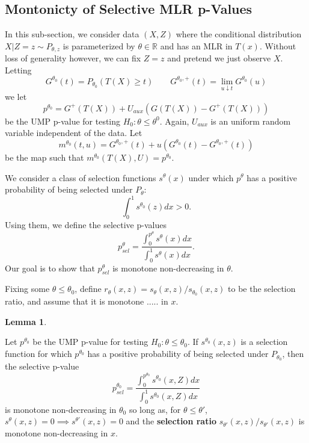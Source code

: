 \documentclass{article}
\newtheorem{lemma}{Lemma}
\newcommand{\R}{\mathbb{R}}
\begin{document}
\begin{appendix}
\subsection{Montonicty of Selective MLR p-Values}
\label{sec:one_sided_monotone_appdx}

In this sub-section, we consider data $(X, Z)$ where the conditional distribution $X | Z= z \sim P_{\theta, z}$ is parameterized by $\theta \in \R$ and has an MLR in $T(x)$. Without loss of generality however, we can fix $Z = z$ and pretend we just observe $X$. Letting
\begin{equation*}
    G^{\theta_0}(t ) = P_{\theta_0}(T(X) \geq t) \qquad G^{\theta_0, +}(t) = \lim_{u \downarrow t} G^{\theta_0}(u)
\end{equation*}
we let 
\begin{equation*}
    p^{\theta_0} = G^{+}(T(X)) + U_{aux}(G(T(X)) - G^{+}(T(X)))
\end{equation*}
be the UMP p-value for testing $H_{0}: \theta \leq \theta^{0}$. Again, $U_{aux}$ is an uniform random variable independent of the data. Let 
\begin{equation*}
    m^{\theta_0}(t, u) = G^{\theta_0, +}(t) + u(G^{\theta_0}(t) - G^{\theta_0, +}(t))
\end{equation*}
be the map such that $m^{\theta_0}(T(X), U) = p^{\theta_0}$. 

We consider a class of selection functions $s^{\theta}(x)$ under which $p^{\theta}$ has a positive probability of being selected under $P_{\theta}$:
\begin{equation*}
    \int_0^1 s^{\theta_0}(z) dx > 0. 
\end{equation*}
Using them, we define the selective p-values 
\begin{equation*}
    p^{\theta}_{sel} = \frac{\int_{0}^{p^{\theta}} s^{\theta}(x) dx}{\int_{0}^{1} s^{\theta}(x) dx}.
\end{equation*}
Our goal is to show that $p^{\theta}_{sel}$ is monotone non-decreasing in $\theta$.

Fixing some $\theta \leq \theta_0$, define $r_{\theta}(x, z) = s_{\theta}(x, z)/s_{\theta_0}(x, z)$ to be the selection ratio, and assume that it is monotone ..... in $x$. 

\begin{lemma}
    
\end{lemma}



Let $p^{\theta_0}$ be the UMP p-value for testing $H_0: \theta \leq \theta_0$. If $s^{\theta_0}(x, z)$ is a selection function for which $p^{\theta_0}$ has a positive probability of being selected under $P_{\theta_0}$, then the selective p-value 
    \begin{equation*}
        p_{sel}^{\theta_0} = \frac{\int_0^{p^{\theta_0}} s^{\theta_0}(x, Z)  dx}{ \int_0^1 s^{\theta_0}(x, Z) dx}
    \end{equation*}
    is monotone non-decreasing in $\theta_0$ so long as, for $\theta \leq \theta'$, $s^{\theta}(x, z) = 0 \implies s^{\theta'}(x, z) = 0$ and the \textbf{selection ratio} $s_{\theta'}(x, z)/s_{\theta'}(x, z)$ is monotone non-decreasing in $x$. 


\end{appendix}
\end{document}
